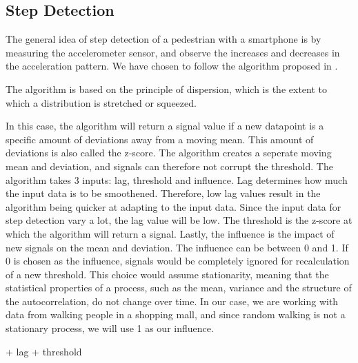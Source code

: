 
\subsection{Step Detection}

The general idea of step detection of a pedestrian with a smartphone is by measuring the accelerometer sensor, and observe the increases and decreases in the acceleration pattern\cite{HybridPositioningPaper}. We have chosen to follow the algorithm proposed in \cite{peakdetection}. 

The algorithm is based on the principle of dispersion, which is the extent to which a distribution is stretched or squeezed. %

In this case, the algorithm will return a signal value if a new datapoint is a specific amount of deviations away from a moving mean. This amount of deviations is also called the z-score. The algorithm creates a seperate moving mean and deviation, and signals can therefore not corrupt the threshold. The algorithm takes 3 inputs: lag, threshold and influence. Lag determines how much the input data is to be smoothened. Therefore, low lag values result in the algorithm being quicker at adapting to the input data. Since the input data for step detection vary a lot, the lag value will be low. The threshold is the z-score at which the algorithm will return a signal. Lastly, the influence is the impact of new signals on the mean and deviation. The influence can be between 0 and 1. If 0 is chosen as the influence, signals would be completely ignored for recalculation of a new threshold. This choice would assume stationarity, meaning that the statistical properties of a process, such as the mean, variance and the structure of the autocorrelation, do not change over time. In our case, we are working with data from walking people in a shopping mall, and since random walking is not a stationary process, we will use 1 as our influence. 

+ lag 
+ threshold





%


